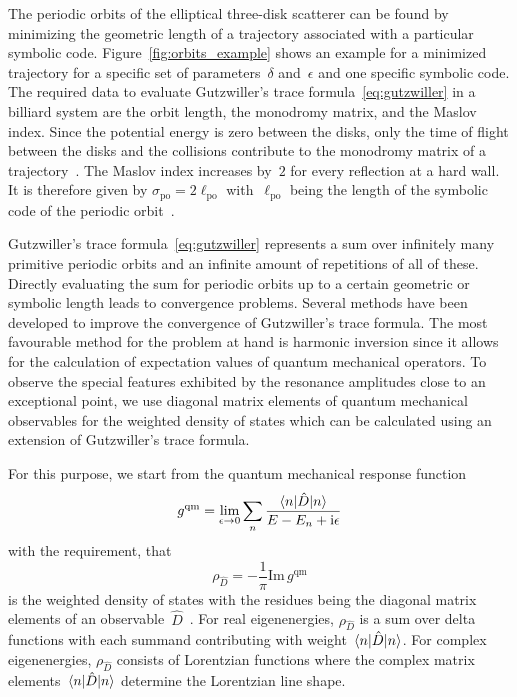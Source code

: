 \documentclass[doublecol]{epl2}
\renewcommand{\Im}{\mathrm{Im}\,}
\begin{document}
The periodic orbits of the elliptical three-disk scatterer can be found by minimizing the geometric length of a trajectory associated with a particular symbolic code. Figure~\ref{fig:orbits_example} shows an example for a minimized trajectory for a specific set of parameters~$\delta$ and~$\epsilon$ and one specific symbolic code. The required data to evaluate Gutzwiller's trace formula~\eqref{eq:gutzwiller} in a billiard system are the orbit length, the monodromy matrix, and the Maslov index. Since the potential energy is zero between the disks, only the time of flight between the disks and the collisions contribute to the monodromy matrix of a trajectory~\cite{bogomolny_smoothed_1988}.
The Maslov index increases by~$2$ for every reflection at a hard wall. It is therefore given by $\sigma_\mathrm{po} = 2 \ell_\mathrm{po}$ with~$\ell_\mathrm{po}$ being the length of the symbolic code of the periodic orbit~\cite{eckhardt_quantum_1995}.

Gutzwiller's trace formula~\eqref{eq:gutzwiller} represents a sum over infinitely many primitive periodic orbits and an infinite amount of repetitions of all of these. Directly evaluating the sum for periodic orbits up to a certain geometric or symbolic length leads to convergence problems. Several methods have been developed to improve the convergence of Gutzwiller's trace formula. The most favourable method for the problem at hand is harmonic inversion since it allows for the calculation of expectation values of quantum mechanical operators. To observe the special features exhibited by the resonance amplitudes close to an exceptional point, we use diagonal matrix elements of quantum mechanical observables for the weighted density of states which can be calculated using an extension of Gutzwiller's trace formula.

For this purpose, we start from the quantum mechanical response function
\begin{equation}
  g^\mathrm{qm} = \lim_{\epsilon \to 0} \sum_n \frac{\braket{n|\hat{D}|n}}{E-E_n+\mathrm{i}\epsilon}
\end{equation}
with the requirement, that
\begin{equation}
  \rho_{\hat{D}} = -\frac{1}{\pi} \Im g^\mathrm{qm}
  \label{eq:weighted_density}
\end{equation}
is the weighted density of states with the residues being the diagonal matrix elements of an observable~$\hat{D}$~\cite{eckhardt_semiclassical_1992}. For real eigenenergies, $\rho_{\hat{D}}$ is a sum over delta functions with each summand contributing with weight~$\braket{n|\hat{D}|n}$. For complex eigenenergies, $\rho_{\hat{D}}$ consists of Lorentzian functions where the complex matrix elements~$\braket{n|\hat{D}|n}$ determine the Lorentzian line shape.
\end{document}
